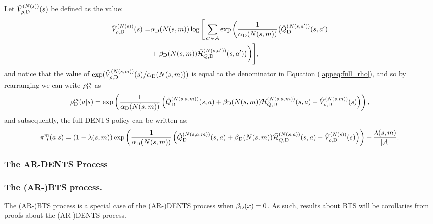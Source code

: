          Let ${\hat{V}^{(N(s))}_{\rho,{\textnormal{D}}}}(s)$ be defined as the value:
        \begin{align}
            {\hat{V}^{(N(s))}_{\rho,{\textnormal{D}}}}(s) = &
                {\alpha_{{\textnormal{D}}}}(N(s,m)) \log \Bigg[ \sum_{a'\in\mathcal{A}} \exp\bigg(\frac{1}{{\alpha_{{\textnormal{D}}}}(N(s,m))}
                    \big({\hat{Q}^{(N(s,a'))}_{{\textnormal{D}}}}(s,a') \nonumber \\
                &+ {\beta_{{\textnormal{D}}}}(N(s,m)){\bar{\mathcal{H}}^{(N(s,a'))}_{Q,{\textnormal{D}}}}(s,a') \big)\bigg)\Bigg], \label{appeq:v_rho}
        \end{align} 
        and notice that the value of $\exp({\hat{V}^{(N(s,m))}_{\rho,{\textnormal{D}}}}(s)/{\alpha_{{\textnormal{D}}}}(N(s,m)))$ is equal to the denominator in Equation (\ref{appeq:full_rho}), and so by rearranging we can write ${\rho^{m}_{{\textnormal{D}}}}$ as 
        \begin{align}
            {\rho^{m}_{{\textnormal{D}}}}(a|s) = 
                \exp\left(\frac{1}{{\alpha_{{\textnormal{D}}}}(N(s,m))}\left(
                    {\hat{Q}^{(N(s,a,m))}_{{\textnormal{D}}}}(s,a) 
                    + {\beta_{{\textnormal{D}}}}(N(s,m)){\bar{\mathcal{H}}^{(N(s,a,m))}_{Q,{\textnormal{D}}}}(s,a) 
                    - {\hat{V}^{(N(s,m))}_{\rho,{\textnormal{D}}}}(s) \right)\right), \label{appeq:rho_concise}
        \end{align}
        and subsequently, the full DENTS policy can be written as:
        \begin{align}
            {\pi^{m}_{{\textnormal{D}}}}(a|s) = (1-\lambda(s,m))\exp\left(\frac{1}{{\alpha_{{\textnormal{D}}}}(N(s,m))}\left({\hat{Q}^{(N(s,a,m))}_{{\textnormal{D}}}}(s,a) + {\beta_{{\textnormal{D}}}}(N(s,m)){\bar{\mathcal{H}}^{(N(s,a))}_{Q,{\textnormal{D}}}}(s,a) - {\hat{V}^{(N(s))}_{\rho,{\textnormal{D}}}}(s) \right)\right) + \frac{\lambda(s,m)}{|\mathcal{A}|}. \label{appeq:dents_search_policy_exact} 
        \end{align}








        \subsubsection{The AR-DENTS Process}
        









        \subsubsection{The (AR-)BTS process.}
        The (AR-)BTS process is a special case of the (AR-)DENTS process when ${\beta_{{\textnormal{D}}}}(x)=0$. As such, results about BTS will be corollaries from proofs about the (AR-)DENTS process.













